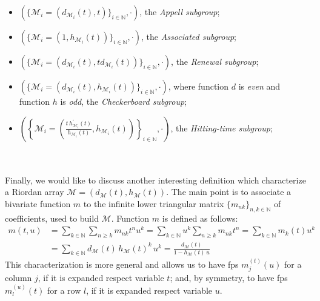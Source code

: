 \begin{itemize}
    \item $\left(\lbrace \mathcal{M}_{i}=(d_{\mathcal{M}_{i}}(t),t)
        \rbrace_{i\in\mathbb{N}},\cdot\right)$, the \emph{Appell subgroup};
    \item $\left(\lbrace \mathcal{M}_{i}=(1,h_{\mathcal{M}_{i}}(t))
        \rbrace_{i\in\mathbb{N}},\cdot\right)$, the \emph{Associated subgroup};
    \item $\left(\lbrace \mathcal{M}_{i}=(d_{\mathcal{M}_{i}}(t),td_{\mathcal{M}_{i}}(t))
        \rbrace_{i\in\mathbb{N}},\cdot\right)$, the \emph{Renewal subgroup};
    \item $\left(\lbrace \mathcal{M}_{i}=(d_{\mathcal{M}_{i}}(t),h_{\mathcal{M}_{i}}(t))
        \rbrace_{i\in\mathbb{N}},\cdot\right)$, where function $d$ is \emph{even} and 
        function $h$ is \emph{odd}, the \emph{Checkerboard subgroup};
    \item $\left(\left\lbrace \mathcal{M}_{i}=\left(\frac{t\,h_{\mathcal{M}_{i}}^{\prime}(t)}
            {h_{\mathcal{M}_{i}}(t)},h_{\mathcal{M}_{i}}(t)\right)
        \right\rbrace_{i\in\mathbb{N}},\cdot\right)$, the \emph{Hitting-time subgroup};
\end{itemize}
\quad
\\\\
Finally, 
we would like to discuss another interesting definition which characterize
a Riordan array $\mathcal{M}=(d_{\mathcal{M}}(t),h_{\mathcal{M}}(t))$. 
The main point is to associate a bivariate function $m$ 
to the infinite lower triangular matrix $\lbrace m_{nk}\rbrace_{n,k\in\mathbb{N}}$
of coefficients, used to build $\mathcal{M}$. Function $m$ is defined as follows:
\begin{displaymath}
    \begin{split}
        m(t,u) &= \sum_{k\in\mathbb{N}}{\sum_{n\geq k}{m_{nk} t^{n} u^{k}}}
            = \sum_{k\in\mathbb{N}}{u^{k}\sum_{n\geq k}{m_{nk} t^{n}}}
            = \sum_{k\in\mathbb{N}}{m_{k}(t)u^{k}}\\
            &= \sum_{k\in\mathbb{N}}{d_{\mathcal{M}}(t)\,h_{\mathcal{M}}(t)^{k}\,u^{k}}
            = \frac{d_{\mathcal{M}}(t)}{1-h_{\mathcal{M}}(t)\,u}
    \end{split}
\end{displaymath}
This characterization is more general and allows us to have \ac{fps} $m_{j}^{(t)}(u)$
for a column $j$, if it is expanded respect variable $t$; and, by symmetry,
to have \ac{fps} $m_{l}^{(u)}(t)$ for a row $l$, if it is expanded respect variable $u$.









